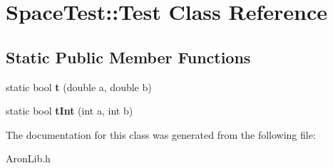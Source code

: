 \hypertarget{class_space_test_1_1_test}{}\section{Space\+Test\+:\+:Test Class Reference}
\label{class_space_test_1_1_test}
\subsection*{Static Public Member Functions}
\begin{DoxyCompactItemize}
\item 
\mbox{\label{class_space_test_1_1_test_a5887b0a589deafcecd50c7c0018897d7}} 
static bool {\bfseries t} (double a, double b)
\item 
\mbox{\label{class_space_test_1_1_test_af846f71be01ca530273d23e3f6b3e9a2}} 
static bool {\bfseries t\+Int} (int a, int b)
\end{DoxyCompactItemize}


The documentation for this class was generated from the following file\+:\begin{DoxyCompactItemize}
\item 
Aron\+Lib.\+h\end{DoxyCompactItemize}
